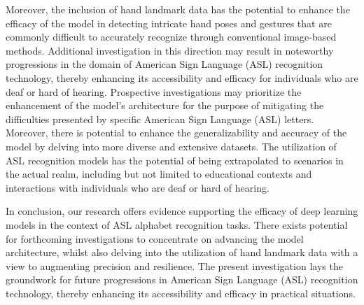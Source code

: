 \documentclass[conference]{IEEEtran}
\begin{document}
Moreover, the inclusion of hand landmark data has the potential to enhance the efficacy of the model in detecting intricate hand poses and gestures that are commonly difficult to accurately recognize through conventional image-based methods. Additional investigation in this direction may result in noteworthy progressions in the domain of American Sign Language (ASL) recognition technology, thereby enhancing its accessibility and efficacy for individuals who are deaf or hard of hearing.
Prospective investigations may prioritize the enhancement of the model's architecture for the purpose of mitigating the difficulties presented by specific American Sign Language (ASL) letters. Moreover, there is potential to enhance the generalizability and accuracy of the model by delving into more diverse and extensive datasets. The utilization of ASL recognition models has the potential of being extrapolated to scenarios in the actual realm, including but not limited to educational contexts and interactions with individuals who are deaf or hard of hearing.

In conclusion, our research offers evidence supporting the efficacy of deep learning models in the context of ASL alphabet recognition tasks. There exists potential for forthcoming investigations to concentrate on advancing the model architecture, whilst also delving into the utilization of hand landmark data with a view to augmenting precision and resilience. The present investigation lays the groundwork for future progressions in American Sign Language (ASL) recognition technology, thereby enhancing its accessibility and efficacy in practical situations.
\end{document}
